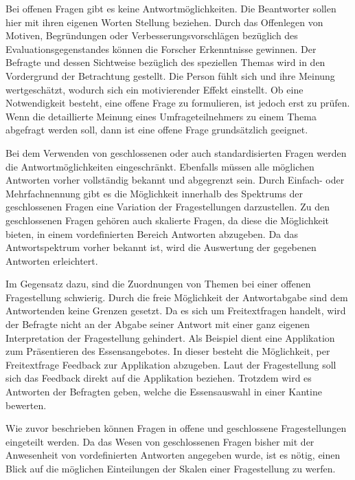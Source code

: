 Bei offenen Fragen gibt es keine Antwortmöglichkeiten.
Die Beantworter sollen hier mit ihren eigenen Worten Stellung beziehen.
Durch das Offenlegen von Motiven, Begründungen oder Verbesserungsvorschlägen bezüglich des Evaluationsgegenstandes können die Forscher Erkenntnisse gewinnen.
Der Befragte und dessen Sichtweise bezüglich des speziellen Themas wird in den Vordergrund der Betrachtung gestellt.\autocite[Vgl.][S. 31]{2009Fragebogen} %
Die Person fühlt sich und ihre Meinung wertgeschätzt, wodurch sich ein motivierender Effekt einstellt.
Ob eine Notwendigkeit besteht, eine offene Frage zu formulieren, ist jedoch erst zu prüfen.
Wenn die detaillierte Meinung eines Umfrageteilnehmers zu einem Thema abgefragt werden soll, dann ist eine offene Frage grundsätzlich geeignet. 
 
Bei dem Verwenden von geschlossenen oder auch standardisierten Fragen werden die Antwortmöglichkeiten eingeschränkt.
Ebenfalls müssen alle möglichen Antworten vorher vollständig bekannt und abgegrenzt sein.\autocite[Vgl.][S. 66]{2014Fragebogen} %
Durch Einfach- oder Mehrfachnennung gibt es die Möglichkeit innerhalb des Spektrums der geschlossenen Fragen eine Variation der Fragestellungen darzustellen.\autocite[Vgl.][S. 31]{2009Fragebogen} %
Zu den geschlossenen Fragen gehören auch skalierte Fragen, da diese die Möglichkeit bieten, in einem vordefinierten Bereich Antworten abzugeben.
Da das Antwortspektrum vorher bekannt ist, wird die Auswertung der gegebenen Antworten erleichtert.

Im Gegensatz dazu, sind die Zuordnungen von Themen bei einer offenen Fragestellung schwierig.
Durch die freie Möglichkeit der Antwortabgabe sind dem Antwortenden keine Grenzen gesetzt.
Da es sich um Freitextfragen handelt, wird der Befragte nicht an der Abgabe seiner Antwort mit einer ganz eigenen Interpretation der Fragestellung gehindert. 
Als Beispiel dient eine Applikation zum Präsentieren des Essensangebotes.
In dieser besteht die Möglichkeit, per Freitextfrage Feedback zur Applikation abzugeben.
Laut der Fragestellung soll sich das Feedback direkt auf die Applikation beziehen.
Trotzdem wird es Antworten der Befragten geben, welche die Essensauswahl in einer Kantine bewerten.

Wie zuvor beschrieben können Fragen in offene und geschlossene Fragestellungen eingeteilt werden.
Da das Wesen von geschlossenen Fragen bisher mit der Anwesenheit von vordefinierten Antworten angegeben wurde, ist es nötig, einen Blick auf die möglichen Einteilungen der Skalen einer Fragestellung zu werfen.

